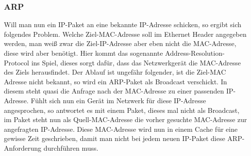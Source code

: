 \documentclass[a4paper,14pt,headsepline]{scrartcl}
\begin{document}
\subsubsection{ARP}
Will man nun ein IP-Paket an eine bekannte IP-Adresse schicken, so ergibt sich folgendes Problem. Welche Ziel-MAC-Adresse soll im Ethernet Header angegeben werden, man weiß zwar die Ziel-IP-Adresse aber eben nicht die MAC-Adresse, diese wird aber benötigt. Hier kommt das sogenannte Address-Resolution-Protocol ins Spiel, dieses sorgt dafür, dass das Netzwerkgerät die MAC-Adresse des Ziels herausfindet. Der Ablauf ist ungefähr folgender, ist die Ziel-MAC Adresse nicht bekannt, so wird ein ARP-Paket als Broadcast verschickt. In diesem steht quasi die Anfrage nach der MAC-Adresse zu einer passenden IP-Adresse. Fühlt sich nun ein Gerät im Netzwerk für diese IP-Adresse angesprochen, so antwortet es mit einem Paket, dieses mal nicht als Broadcast, im Paket steht nun als Quell-MAC-Adresse die vorher gesuchte MAC-Adresse zur angefragten IP-Adresse. Diese MAC-Adresse wird nun in einem Cache für eine gewisse Zeit geschrieben, damit man nicht bei jedem neuen IP-Paket diese ARP-Anforderung durchführen muss.

\newpage
\end{document}
